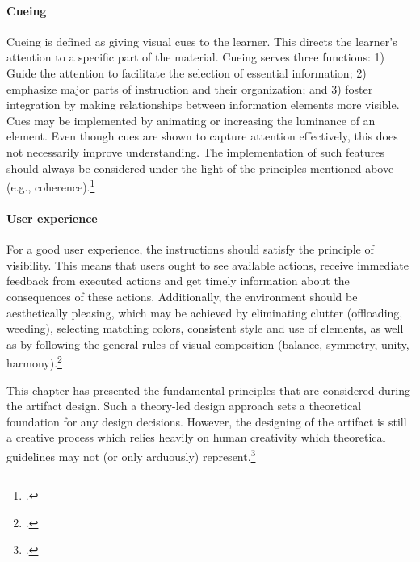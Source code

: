 \paragraph{Cueing} Cueing is defined as giving visual cues to the learner. This directs the learner's attention to a specific part of the material. Cueing serves three functions: 1) Guide the attention to facilitate the selection of essential information; 2) emphasize major parts of instruction and their organization; and 3) foster integration by making relationships between information elements more visible. Cues may be implemented by animating or increasing the luminance of an element. Even though cues are shown to capture attention effectively, this does not necessarily improve understanding. The implementation of such features should always be considered under the light of the principles mentioned above (e.g., coherence).\footcites[Cf.][p.114 et seqq]{deKoningFrameworkAttentionCueing2009}[cf.][chapter 2, paragraph 14]{ClarkElearningscienceinstruction2016}

\paragraph{User experience} For a good user experience, the instructions should satisfy the principle of visibility. This means that users ought to see available actions, receive immediate feedback from executed actions and get timely information about the consequences of these actions. Additionally, the environment should be aesthetically pleasing, which may be achieved by eliminating clutter (offloading, weeding), selecting matching colors, consistent style and use of elements, as well as by following the general rules of visual composition (balance, symmetry, unity, harmony).\footcites[Cf.][p. 16 et seqq]{LeeScreenDesignGuidelines1999}[cf.][p. 16 et seqq]{Nadelhoffer10BestPractices}[cf.][p.20]{KirshInteractivitymultimediainterfaces1997}


This chapter has presented the fundamental principles that are considered during the artifact design. Such a theory-led design approach sets a theoretical foundation for any design decisions. However, the designing of the artifact is still a creative process which relies heavily on human creativity which theoretical guidelines may not (or only arduously) represent.\footcites[Cf.][p.7]{VaishnaviDesignScienceResearch}